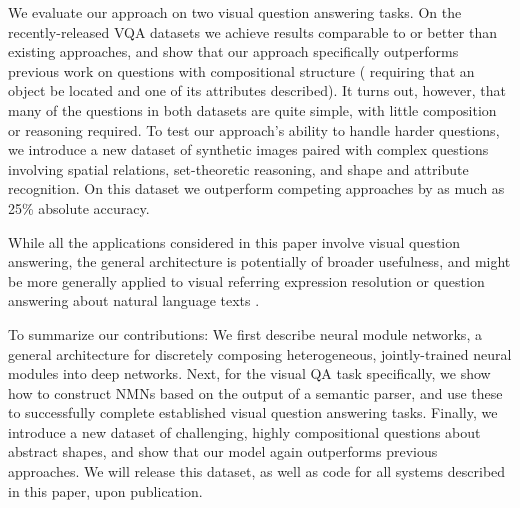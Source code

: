 




We evaluate our approach on two visual question answering tasks. On the
recently-released VQA \cite{antol15iccv} datasets we achieve results comparable
to or better than existing approaches, and show that our approach specifically
outperforms previous work on questions with compositional structure (\eg
requiring that an object be located and one of its attributes described). It
turns out, however, that many of the questions in both datasets are quite
simple, with little composition or reasoning required. To test our approach's
ability to handle harder questions, we introduce a new dataset of synthetic
images paired with complex questions involving spatial relations, set-theoretic
reasoning, and shape and attribute recognition.  On this dataset we outperform
competing approaches by as much as 25\% absolute accuracy.

While all the applications considered in this paper involve visual question
answering, the general architecture is potentially of broader usefulness, and
might be more generally applied to visual referring expression resolution
\cite{FitzGerald13Referring} or question answering about natural language texts
\cite{Iyyer14Factoid}.


To summarize our contributions: We first describe neural module networks, a
general architecture for discretely composing heterogeneous, jointly-trained
neural modules into deep networks. Next, for the visual QA task specifically, we
show how to construct NMNs based on the output of a semantic parser, and use
these to successfully complete established visual question answering tasks.
Finally, we introduce a new dataset of challenging, highly compositional
questions about abstract shapes, and show that our model again outperforms
previous approaches. We will release this dataset, as well as code for all
systems described in this paper, upon publication.

